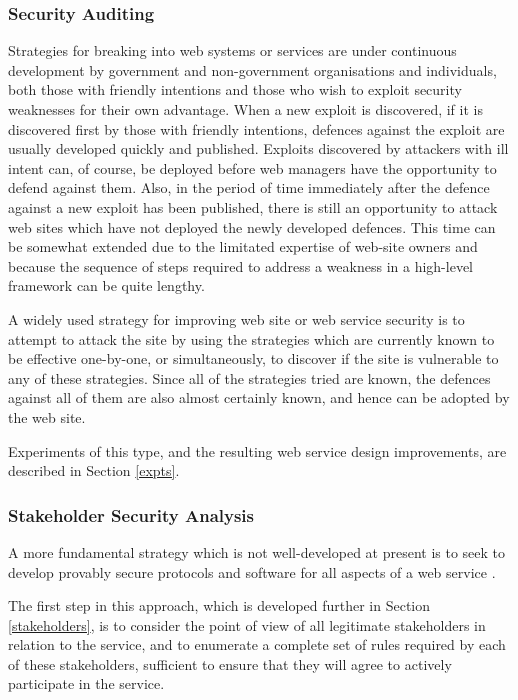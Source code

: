 \subsubsection{Security Auditing}\label{audit}

Strategies for breaking into web systems or services are under continuous
development by government and non-government organisations and individuals,
both those with friendly intentions and those who wish to exploit security
weaknesses for their own advantage. When
a new exploit is discovered, if it is discovered first by those with 
friendly intentions, defences against the exploit are usually developed
quickly and published. Exploits discovered by attackers with ill intent
can, of course, be deployed before web managers have the opportunity
to defend against them. Also, in the period of time immediately after
the defence against a new exploit has been published, there is still
an opportunity to attack web sites which have not deployed the newly developed
defences. This time can be somewhat extended due to the limitated expertise
of web-site owners and because the sequence of steps required to address a weakness
in a high-level framework can be quite lengthy.

A widely used strategy for improving web site or web service security is
to attempt to attack the site by using the strategies which are currently
known to be effective one-by-one, or simultaneously, to discover if the
site is vulnerable to any of these strategies. Since all of the strategies
tried are known, the defences against all of them are also almost certainly
known, and hence can be adopted by the web site.

Experiments of this type, and the resulting web service design improvements,
are described in Section \ref{expts}.

\subsubsection{Stakeholder Security Analysis}\label{stsecanal}

A more fundamental strategy which is not well-developed at present is
to seek to develop provably secure protocols and software for all aspects
of a web service \cite{whitman2011principles,mailloux2018examination,bishop2005introduction}.

The first step in this approach, which is developed further in 
Section \ref{stakeholders}, is to consider the point of view of all legitimate stakeholders
in relation to the service, and to enumerate a complete set of rules
required by each of these stakeholders, sufficient to ensure that they
will agree to actively participate in the service.

